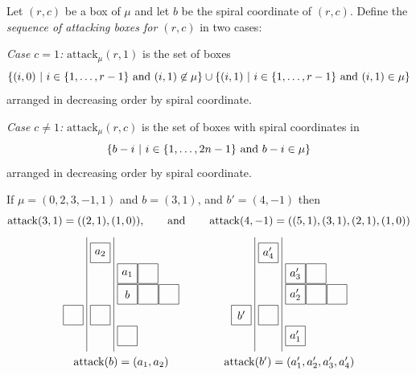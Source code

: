 \documentclass[11pt]{article}
\theoremstyle{plain}
\theoremstyle{definition}
\newenvironment{example}
  {\pushQED{\qed}\exampleinner}
  {\popQED\endexampleinner}
\theoremstyle{remark}
\numberwithin{equation}{section}
\newcounter{r}
\newcounter{s}
\begin{document}
Let $(r, c)$ be a box of $\mu$ and let $b$ be the spiral coordinate of $(r,c)$.  Define 
the \emph{sequence of attacking boxes for $(r,c)$} in two cases:

\smallskip\noindent
\emph{Case $c=1$:} 
$\mathrm{attack}_\mu(r,1)$  is the set of boxes
$$\{ (i,0)\ |\ \hbox{$i\in \{1, \ldots, r-1\}$ and $(i,1)\not\in \mu$}\}\cup \{ (i,1)\ |\  \hbox{$i\in \{1, \ldots, r-1\}$ and $(i,1)\in \mu$}\}$$
arranged in decreasing order by spiral coordinate.

\smallskip\noindent
\emph{Case $c\ne1$:} 
$\mathrm{attack}_\mu(r,c)$  is the set of boxes with spiral coordinates in
$$\{ b-i\ |\ \hbox{$i\in \{1, \ldots, 2n-1\}$ and $b-i\in \mu$}\}$$
arranged in decreasing order by spiral coordinate.

\begin{example}
If $\mu=(0,2,3,-1,1)$ and $b = (3, 1)$, and $b' = (4, -1)$ then
$$
\operatorname{attack}(3,1) = ((2,1),(1,0)), \qquad\hbox{and} \qquad
\operatorname{attack}(4,-1) = ((5,1), (3,1),(2,1), (1,0)) 
$$
$$
\begin{matrix}
\begin{matrix}
\begin{tikzpicture}[scale = 0.65]
\foreach \x\y in {1/0, 2/1, 2/2,  3/1, 3/2, 3/3, 4/0, 4/-1, 5/1}{
    \pgfmathtruncatemacro{\shift}{(\y>0) - (\y<0)}
    \begin{scope}[xshift = 0.3*\shift cm]
    \draw[thin] (\y+0.025, -\x-0.025) rectangle (0.975+\y, -\x-0.975);
    \draw (0.5+\y,-\x-0.5) node (\x\y) {};
    \end{scope}
}
\node at (10) {$a_{2}$};
\node at (21) {$a_1$};
\node at (31) {$b$};
\draw (-0.15, -0.75) -- (-0.15, -6.25);
\draw (1.15, -0.75) -- (1.15, -6.25);
\end{tikzpicture}
\end{matrix}
&\qquad
&\begin{matrix}
\begin{tikzpicture}[scale = 0.65]
\foreach \x\y in {1/0, 2/1, 2/2,  3/1, 3/2, 3/3, 4/0, 4/-1, 5/1}{
    \pgfmathtruncatemacro{\shift}{(\y>0) - (\y<0)}
    \begin{scope}[xshift = 0.3*\shift cm]
    \draw[thin] (\y+0.025, -\x-0.025) rectangle (0.975+\y, -\x-0.975);
    \draw (0.5+\y,-\x-0.5) node (\x\y) {};
    \end{scope}
}
\node at (10) {$a'_4$};
\node at (21) {$a'_3$};
\node at (31) {$a'_2$};
\node at (51) {$a'_1$};
\node at (4-1) {$b'$};
\draw (-0.15, -0.75) -- (-0.15, -6.25);
\draw (1.15, -0.75) -- (1.15, -6.25);
\end{tikzpicture}
\end{matrix}
\\
\mathrm{attack}(b) = (a_1,a_2)
&&\mathrm{attack}(b') = (a'_1,a'_2, a'_3,a_4')
\end{matrix}
$$
\end{example}
\end{document}
